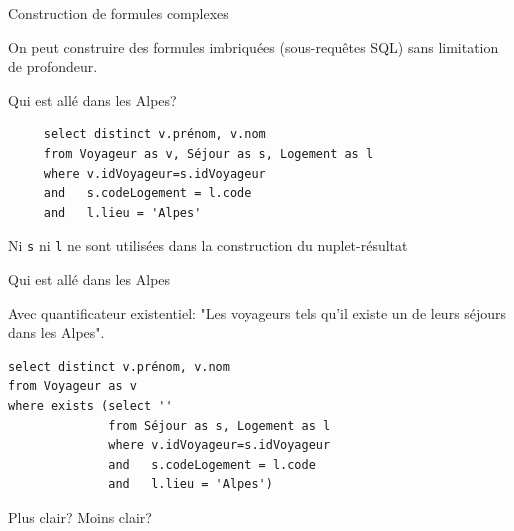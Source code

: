 \begin{frame}[fragile]{Construction de formules complexes}

On peut construire des formules imbriquées (sous-requêtes SQL) 
sans limitation de profondeur.

\vfill 

Qui est allé dans les Alpes?
\begin{verbatim}
     select distinct v.prénom, v.nom
     from Voyageur as v, Séjour as s, Logement as l
     where v.idVoyageur=s.idVoyageur
     and   s.codeLogement = l.code
     and   l.lieu = 'Alpes'
\end{verbatim}


\vfill
\begin{blocgauche}
Ni \texttt{s} ni \texttt{l} ne sont utilisées dans la construction du nuplet-résultat 
\end{blocgauche}
\end{frame}



\begin{frame}[fragile]{Qui est allé dans les Alpes}


Avec quantificateur existentiel: "Les voyageurs tels \alert{qu'il existe} un de leurs séjours dans les Alpes".

\vfill 

\begin{verbatim}
select distinct v.prénom, v.nom
from Voyageur as v
where exists (select '' 
              from Séjour as s, Logement as l
              where v.idVoyageur=s.idVoyageur
              and   s.codeLogement = l.code
              and   l.lieu = 'Alpes')
\end{verbatim}


\vfill
\begin{blocgauche}
Plus clair? Moins clair?
\end{blocgauche}
\end{frame}

